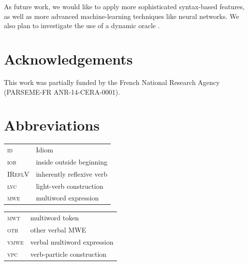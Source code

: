 \documentclass[output=paper,modfonts]{langscibook}
\begin{document}
As future work, we would like to apply more sophisticated syntax-based features, as well as more advanced machine-learning techniques like neural networks. We also plan to investigate the use of a dynamic oracle \citep{goldberg:2012}.
\section*{Acknowledgements}
This work was partially funded by the French National Research Agency (PARSEME-FR ANR-14-CERA-0001).

\section*{Abbreviations}

\begin{tabularx}{.49\textwidth}{ll}
\textsc{id} & Idiom\\ 
\textsc{iob}& inside outside beginning\\ 
\textsc{IReflV} & inherently reflexive verb  \\
\textsc{lvc} & light-verb construction  \\
\textsc{mwe} & multiword expression  \\
\end{tabularx}
\begin{tabularx}{.49\textwidth}{ll}
\textsc{mwt} & multiword token  \\
\textsc{oth} & other verbal MWE \\
\textsc{vmwe} & verbal multiword expression \\
\textsc{vpc} & verb-particle construction  \\ 
\end{tabularx}

\newpage
{\sloppy
\printbibliography[heading=subbibliography,notkeyword=this]
}
\end{document}
